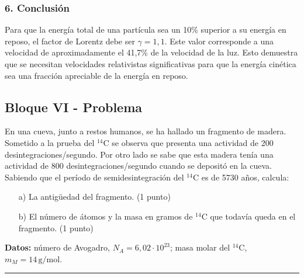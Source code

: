 \subsubsection*{6. Conclusión}
\begin{cajaconclusion}
Para que la energía total de una partícula sea un 10\% superior a su energía en reposo, el factor de Lorentz debe ser $\gamma=1,1$. Este valor corresponde a una velocidad de aproximadamente el 41,7\% de la velocidad de la luz. Esto demuestra que se necesitan velocidades relativistas significativas para que la energía cinética sea una fracción apreciable de la energía en reposo.
\end{cajaconclusion}

\newpage
\subsection{Bloque VI - Problema}
\label{subsec:VI_A_2013_jun_ord}

\begin{cajaenunciado}
En una cueva, junto a restos humanos, se ha hallado un fragmento de madera. Sometido a la prueba del $^{14}\text{C}$ se observa que presenta una actividad de 200 desintegraciones/segundo. Por otro lado se sabe que esta madera tenía una actividad de 800 desintegraciones/segundo cuando se depositó en la cueva. Sabiendo que el período de semidesintegración del $^{14}\text{C}$ es de 5730 años, calcula:
\begin{enumerate}
    \item[a)] La antigüedad del fragmento. (1 punto)
    \item[b)] El número de átomos y la masa en gramos de $^{14}\text{C}$ que todavía queda en el fragmento. (1 punto)
\end{enumerate}
\textbf{Datos:} número de Avogadro, $N_{A}=6,02\cdot10^{23}$; masa molar del $^{14}\text{C}$, $m_{M}=14\,\text{g/mol}$.
\end{cajaenunciado}
\hrule

